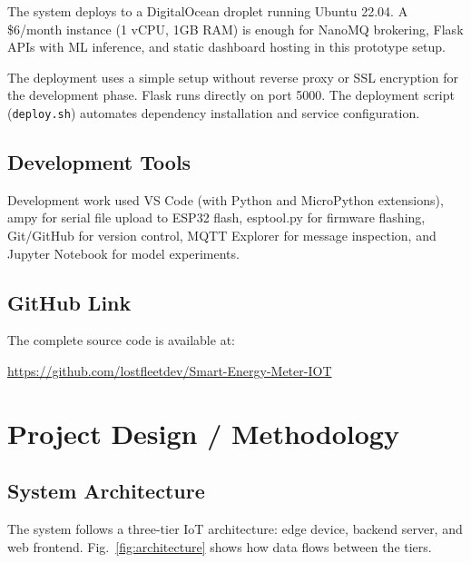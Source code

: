 \documentclass[12pt, a4paper]{article}
\numberwithin{figure}{section}
\numberwithin{table}{section}
\begin{document}
	The system deploys to a DigitalOcean droplet running Ubuntu 22.04. A \$6/month instance (1 vCPU, 1GB RAM) is enough for NanoMQ brokering, Flask APIs with ML inference, and static dashboard hosting in this prototype setup.
	
	The deployment uses a simple setup without reverse proxy or SSL encryption for the development phase. Flask runs directly on port 5000. The deployment script (\texttt{deploy.sh}) automates dependency installation and service configuration.
	
	\subsection{Development Tools}
	
	Development work used VS Code (with Python and MicroPython extensions), ampy for serial file upload to ESP32 flash, esptool.py for firmware flashing, Git/GitHub for version control, MQTT Explorer for message inspection, and Jupyter Notebook for model experiments.
	
	\subsection{GitHub Link}
	
	The complete source code is available at:
	
	\url{https://github.com/lostfleetdev/Smart-Energy-Meter-IOT}
	
	\newpage
	
	\section{Project Design / Methodology}\label{sec:design}
	
	\subsection{System Architecture}
	
	The system follows a three-tier IoT architecture: edge device, backend server, and web frontend. Fig.~\ref{fig:architecture} shows how data flows between the tiers.
	
\end{document}
